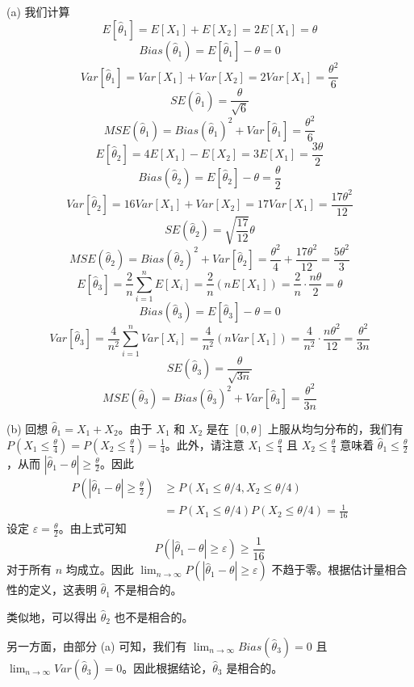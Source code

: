 \begin{questions}
\begin{solution}
(a) 我们计算
\[
E[\hat{\theta}_1] = E[X_1] + E[X_2] = 2E[X_1] = \theta
\]
\[
Bias(\hat{\theta}_1) = E[\hat{\theta}_1] - \theta = 0
\]
\[
Var[\hat{\theta}_1] = Var[X_1] + Var[X_2] = 2Var[X_1] = \frac{\theta^2}{6}
\]
\[
SE(\hat{\theta}_1) = \frac{\theta}{\sqrt{6}}
\]
\[
MSE(\hat{\theta}_1) = Bias(\hat{\theta}_1)^2 + Var[\hat{\theta}_1] = \frac{\theta^2}{6}
\]
\[
E[\hat{\theta}_2] = 4E[X_1] - E[X_2] = 3E[X_1] = \frac{3\theta}{2}
\]
\[
Bias(\hat{\theta}_2) = E[\hat{\theta}_2] - \theta = \frac{\theta}{2}
\]
\[
Var[\hat{\theta}_2] = 16Var[X_1] + Var[X_2] = 17Var[X_1] = \frac{17\theta^2}{12}
\]
\[
SE(\hat{\theta}_2) = \sqrt{\frac{17}{12}}\theta
\]
\[
MSE(\hat{\theta}_2) = Bias(\hat{\theta}_2)^2 + Var[\hat{\theta}_2] = \frac{\theta^2}{4} + \frac{17\theta^2}{12} = \frac{5\theta^2}{3}
\]
\[
E[\hat{\theta}_3] = \frac{2}{n} \sum_{i=1}^n E[X_i] = \frac{2}{n} (nE[X_1]) = \frac{2}{n} \cdot \frac{n\theta}{2} = \theta
\]
\[
Bias(\hat{\theta}_3) = E[\hat{\theta}_3] - \theta = 0
\]
\[
Var[\hat{\theta}_3] = \frac{4}{n^2} \sum_{i=1}^n Var[X_i] = \frac{4}{n^2} (nVar[X_1]) = \frac{4}{n^2} \cdot \frac{n\theta^2}{12} = \frac{\theta^2}{3n}
\]
\[
SE(\hat{\theta}_3) = \frac{\theta}{\sqrt{3n}}
\]
\[
MSE(\hat{\theta}_3) = Bias(\hat{\theta}_3)^2 + Var[\hat{\theta}_3] = \frac{\theta^2}{3n}
\]

(b) 回想 $\hat{\theta}_1 = X_1 + X_2$。由于 $X_1$ 和 $X_2$ 是在 $[0, \theta]$ 上服从均匀分布的，我们有 $P(X_1 \le \frac{\theta}{4}) = P(X_2 \le \frac{\theta}{4}) = \frac{1}{4}$。此外，请注意 $X_1 \le \frac{\theta}{4}$ 且 $X_2 \le \frac{\theta}{4}$ 意味着 $\hat{\theta}_1 \le \frac{\theta}{2}$，从而 $|\hat{\theta}_1 - \theta| \ge \frac{\theta}{2}$。因此
\begin{align*}
P\left( |\hat{\theta}_1 - \theta| \ge \frac{\theta}{2} \right) &\ge P(X_1 \le \theta/4, X_2 \le \theta/4) \\
&= P(X_1 \le \theta/4)P(X_2 \le \theta/4) = \frac{1}{16}
\end{align*}
设定 $\varepsilon = \frac{\theta}{2}$。由上式可知
\[
P\left( |\hat{\theta}_1 - \theta| \ge \varepsilon \right) \ge \frac{1}{16}
\]
对于所有 $n$ 均成立。因此 $\lim_{n \to \infty} P\left( |\hat{\theta}_1 - \theta| \ge \varepsilon \right)$ 不趋于零。根据估计量相合性的定义，这表明 $\hat{\theta}_1$ 不是相合的。

类似地，可以得出 $\hat{\theta}_2$ 也不是相合的。

另一方面，由部分 (a) 可知，我们有 $\lim_{n \to \infty} Bias(\hat{\theta}_3) = 0$ 且 $\lim_{n \to \infty} Var(\hat{\theta}_3) = 0$。因此根据结论，$\hat{\theta}_3$ 是相合的。
\end{solution}


\end{questions}
